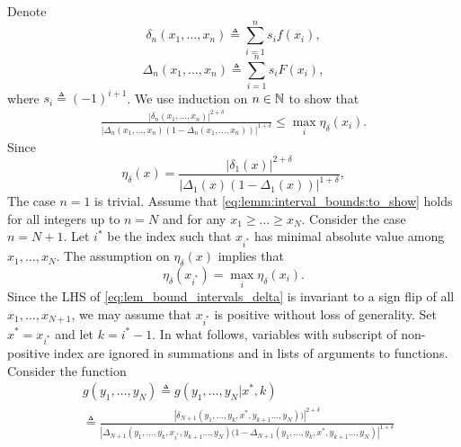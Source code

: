 \begin{proof-of-lemma}[\ref{lem:bound_intervals_delta}]
  Denote 
  \begin{equation*}
    \delta_n(x_1,\ldots,x_n) \triangleq \sum_{i=1}^{n} s_i f(x_i),
  \end{equation*}
  \begin{equation*}
    \Delta_n(x_1,\ldots,x_n) \triangleq  \sum_{i=1}^n s_i F(x_i), 
  \end{equation*}
  where $s_i \triangleq (-1)^{i+1}$. We use induction on $n \in \mathbb{N}$ to show that 
  \begin{align}
    \label{eq:lemm:interval_bounds:to_show}
    \frac{ \left| \delta_n(x_1,\ldots,x_n) \right|^{2+\delta}} 
         {\left|\Delta_n(x_1,\ldots,x_n)\left(1- \Delta_n(x_1,\ldots,x_n) \right) \right|^{1+\delta} } \leq \max_{i}\eta_{\delta}(x_i).
  \end{align}
  Since 
  \begin{equation*}
    \eta_\delta(x) =  \frac{  \left|\delta_1(x) \right|^{2+\delta}}{\left|\Delta_1(x)
      (1-\Delta_1(x)) \right|^{1+\delta}}, 
  \end{equation*}
  The case $n=1$ is trivial.  
  Assume that \eqref{eq:lemm:interval_bounds:to_show} holds for all integers up to $n = N$ and for any $x_1 \ge \ldots \ge x_N$. Consider the case $n = N+1$. Let $i^*$ be the index such that $x_{i^*}$ has minimal absolute value among $x_1,\ldots,x_N$. The assumption on $\eta_\delta(x)$ implies that
  \begin{equation*}
    \eta_\delta(x_{i^*}) = \max_i \eta_\delta(x_i).
  \end{equation*}
  Since the LHS of \eqref{eq:lem_bound_intervals_delta} is invariant to a sign flip of all $x_1,\ldots,x_{N+1}$, we may assume that $x_{i^*}$ is positive without loss of generality. 
  Set $x^* = x_{i^*}$ and let $k=i^*-1$. In what follows, variables with subscript of non-positive index are ignored in summations and in lists of arguments to functions. Consider the function
  \begin{align}
    & g(y_1,\ldots,y_N) \triangleq g(y_1,\ldots,y_N|x^*,k) \\
    &  \triangleq  \frac{\left| \delta_{N+1}(y_1,\ldots,y_k,x^*,y_{k+1}\ldots,y_N) )\right|^{2+\delta}}{
      \left|\Delta_{N+1}(y_1,\ldots,y_k,x_{i^*},y_{k+1}\ldots,y_N)  (1 -\Delta_{N+1}(y_1,\ldots,y_k,x^*,y_{k+1}\ldots,y_N)  \right|^{1+\delta}
}
\end{align}
\end{proof-of-lemma}
